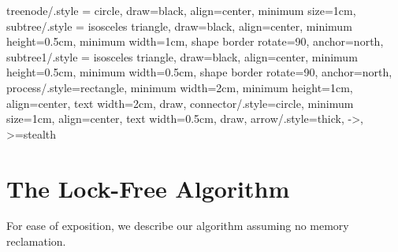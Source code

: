 \begin{limitscope}
\tikzset
{
    treenode/.style = {circle, draw=black, align=center, minimum size=1cm},
    subtree/.style  = {isosceles triangle, draw=black, align=center, minimum height=0.5cm, minimum width=1cm, shape border rotate=90, anchor=north},
    subtree1/.style  = {isosceles triangle, draw=black, align=center, minimum height=0.5cm, minimum width=0.5cm, shape border rotate=90, anchor=north},
    process/.style={rectangle, minimum width=2cm, minimum height=1cm, align=center, text width=2cm, draw},
    connector/.style={circle, minimum size=1cm, align=center, text width=0.5cm, draw},
    arrow/.style={thick, ->, >=stealth}
}
\newcommand{\terminalnode}{terminal node}
\newcommand{\targetnode}{target node}
\newcommand{\accesspath}{access-path}
\newcommand{\nullFlag}{null-flag}
\newcommand{\intentFlag}{intent-flag}
\newcommand{\deleteFlag}{delete-flag}
\newcommand{\promoteFlag}{promote-flag}
\newcommand{\anchornode}{anchor node}
\newcommand{\injection}{injection}
\newcommand{\discovery}{discovery}
\newcommand{\cleanup}{cleanup}

\newcommand{\Search}{\textsc{Search}}
\newcommand{\Insert}{\textsc{Insert}}
\newcommand{\Delete}{\textsc{Delete}}
\newcommand{\Seek}{\textsc{Seek}}
\newcommand{\FindSmallest}{\textsc{FindSmallest}}
\newcommand{\Inject}{\textsc{Inject}}
\newcommand{\FindAndMarkSuccessor}{\textsc{FindAndMarkSuccessor}}
\newcommand{\RemoveSuccessor}{\textsc{RemoveSuccessor}}
\newcommand{\Cleanup}{\textsc{Cleanup}}
\newcommand{\InitializeTypeAndUpdateMode}{\textsc{InitializeTypeAndUpdateMode}}
\newcommand{\UpdateMode}{\textsc{UpdateMode}}
\newcommand{\HelpTargetNode}{\textsc{HelpTargetNode}}
\newcommand{\HelpSuccessorNode}{\textsc{HelpSuccessorNode}}
\newcommand{\MarkChildEdge}{\textsc{MarkChildEdge}}
\newcommand{\remove}[1]{}


\newcommand{\snodeone}{\mathbb{R}}
\newcommand{\snodetwo}{\mathbb{S}}
\newcommand{\snodethree}{\mathbb{T}}
\newcommand{\skey}[1]{\infty_{#1}}


\newcommand{\myleft}{le\!f\!t}
\newcommand{\myright}{right}
\newcommand{\myparent}{parent}

\section{The Lock-Free Algorithm}
\label{sec:icdcn-algorithm}

For ease of exposition, we describe our algorithm assuming no memory reclamation.


\end{limitscope}
